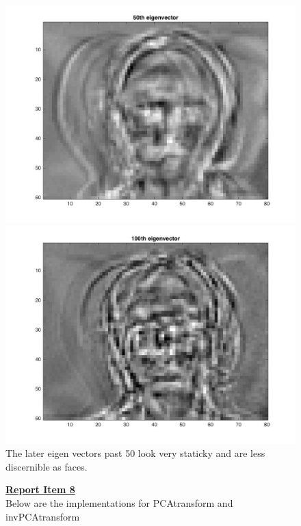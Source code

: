 \documentclass{article}
\begin{document}
\begin{figure}[H]
\includegraphics[scale =.4]{report7_5}
\includegraphics[scale =.4]{report7_6}
\\The later eigen vectors past 50 look very staticky and are less discernible as faces.
\end{figure}

\begin{figure}[H]
  \color{red}
  \underline{\textbf{Report Item 8}}
  \color{black}
  \\ Below are the implementations for PCAtransform and invPCAtransform


\end{figure}
\end{document}
